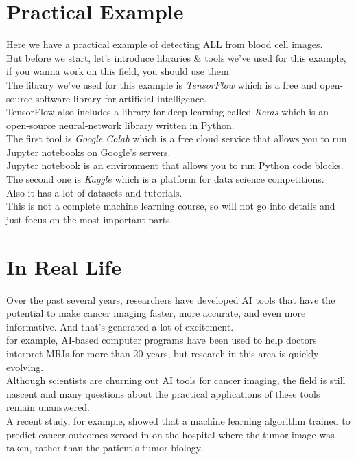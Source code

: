 \documentclass{SBCbookchapter}
\begin{document}
\section*{Practical Example}
Here we have a practical example of detecting ALL from blood cell images. \\
But before we start, let's introduce libraries \& tools we've used for this example, if you wanna
work on this field, you should use them. \\
The library we've used for this example is \textit{TensorFlow} which is a free and open-source software library for artificial intelligence. \\
TensorFlow also includes a library for deep learning called \textit{Keras} which is an open-source neural-network library written in Python. \\
The first tool is \textit{Google Colab} which is a free cloud service
that allows you to run Jupyter notebooks on Google's servers. \\
Jupyter notebook is an environment that allows you to run Python code blocks. \\
The second one is \textit{Kaggle} which is a platform for data science competitions. \\
Also it has a lot of datasets and tutorials. \\
This is not a complete machine learning course, so will not go into details and just
focus on the most important parts.

\section*{In Real Life}
Over the past several years, researchers have developed AI tools that have the potential to make cancer imaging faster, more accurate, and even more informative. And that’s generated a lot of excitement. \\
for example, AI-based computer programs have been used to help doctors interpret MRIs for more than 20 years, but research in this area is quickly evolving. \\
Although scientists are churning out AI tools for cancer imaging, the field is still nascent and many questions about the practical applications of these tools remain unanswered. \\
A recent study, for example, showed that a machine learning algorithm trained to predict cancer outcomes zeroed in on the hospital where the tumor image was taken, rather than the patient’s tumor biology.
\end{document}
